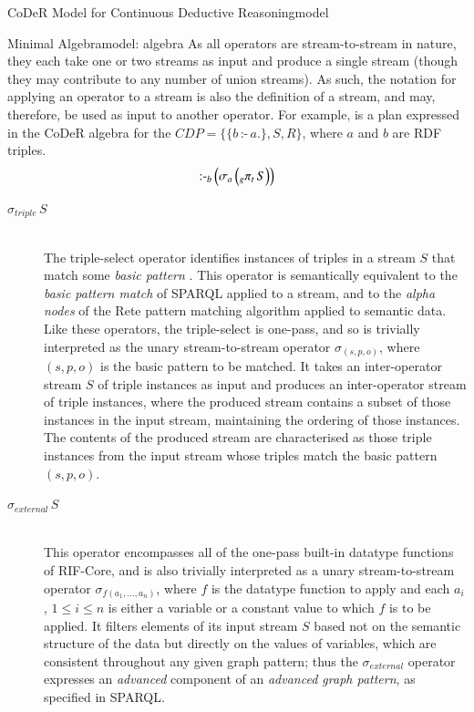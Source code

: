 \begin{nestedsection}{CoDeR Model for Continuous Deductive Reasoning}{model}
\begin{nestedsection}{Minimal Algebra}{model: algebra}
		As all operators are stream-to-stream in nature, they each take one or two streams as input and produce a single stream (though they may contribute to any number of union streams).
		As such, the notation for applying an operator to a stream is also the definition of a stream, and may, therefore, be used as input to another operator.
		For example,  is a plan expressed in the CoDeR algebra for the ${CDP = \{ \{b\,\text{:-}\,a.\}, S, R \}}$, where $a$ and $b$ are RDF triples.
		\begin{equation}\labeleqn{basic-example-plan}
			\text{:-}_b \left( \sigma_a \left( {}_g{\pi_t}\,S \right) \right)
		\end{equation}

		\begin{description}
			\item[$\sigma_{triple}\,S$] \hfill \\
				The triple-select operator identifies instances of triples in a stream $S$ that match some \emph{basic pattern} \citep{w3csparql}.
				This operator is semantically equivalent to the \emph{basic pattern match} of SPARQL applied to a stream, and to the \emph{alpha nodes} of the Rete pattern matching algorithm applied to semantic data.
				Like these operators, the triple-select is one-pass, and so is trivially interpreted as the unary stream-to-stream operator $\sigma_{(s,p,o)}$, where ${(s,p,o)}$ is the basic pattern to be matched.
				It takes an inter-operator stream $S$ of triple instances as input and produces an inter-operator stream of triple instances, where the produced stream contains a subset of those instances in the input stream, maintaining the ordering of those instances.
				The contents of the produced stream are characterised as those triple instances from the input stream whose triples match the basic pattern ${(s,p,o)}$.
			\item[$\sigma_{external}\,S$] \hfill \\
				This operator encompasses all of the one-pass built-in datatype functions of RIF-Core, and is also trivially interpreted as a unary stream-to-stream operator $\sigma_{f(a_1,\dots,a_n)}$, where $f$ is the datatype function to apply and each $a_i$, ${1 \leq i \leq n}$ is either a variable or a constant value to which $f$ is to be applied.
				It filters elements of its input stream $S$ based not on the semantic structure of the data but directly on the values of variables, which are consistent throughout any given graph pattern;
				thus the $\sigma_{external}$ operator expresses an \emph{advanced} component of an \emph{advanced graph pattern}, as specified in SPARQL.

\end{description}
\end{nestedsection}
\end{nestedsection}
